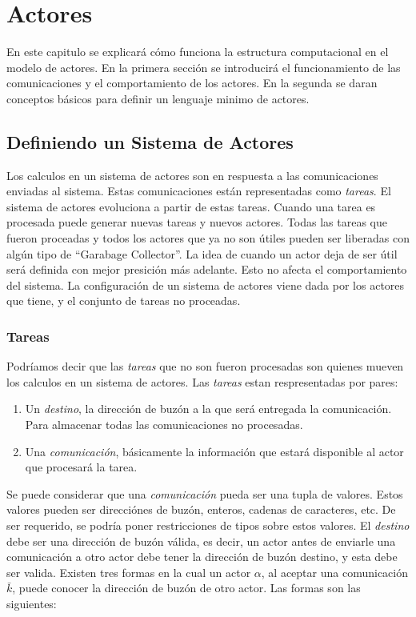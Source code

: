 \chapter{Actores}

En este capitulo se explicará cómo funciona la estructura computacional en el modelo de actores. En la primera sección se introducirá el funcionamiento de las comunicaciones y el comportamiento de los actores. En la segunda se daran conceptos básicos para definir un lenguaje minimo de actores.

\section{Definiendo un Sistema de Actores}

Los calculos en un sistema de actores son en respuesta a las comunicaciones enviadas al sistema. Estas comunicaciones están representadas como \textit{tareas}. El sistema de actores evoluciona a partir de estas tareas. Cuando una tarea es procesada puede generar nuevas tareas y nuevos actores. Todas las tareas que fueron proceadas y todos los actores que ya no son útiles pueden ser liberadas con algún tipo de ``Garabage Collector''. La idea de cuando un actor deja de ser útil será definida con mejor presición más adelante. Esto no afecta el comportamiento del sistema. La configuración de un sistema de actores viene dada por los actores que tiene, y el conjunto de tareas no proceadas.

\subsection{Tareas}

Podríamos decir que las \textit{tareas} que no son fueron procesadas son quienes mueven los calculos en un sistema de actores. Las \textit{tareas} estan respresentadas por pares:

\begin{enumerate}
\item Un \textit{destino}, la dirección de buzón a la que será entregada la comunicación. Para almacenar todas las comunicaciones no procesadas.
\item Una \textit{comunicación}, básicamente la información que estará disponible al actor que procesará la tarea.
\end{enumerate}

Se puede considerar que una \textit{comunicación} pueda ser una tupla de valores. Estos valores pueden ser direcciónes de buzón, enteros, cadenas de caracteres, etc. De ser requerido, se podría poner restricciones de tipos sobre estos valores. 
El \textit{destino} debe ser una dirección de buzón válida, es decir, un actor antes de enviarle una comunicación a otro actor debe tener la dirección de buzón destino, y esta debe ser valida. Existen tres formas en la cual un actor $\alpha$, al aceptar una comunicación $\bar{k}$, puede conocer la dirección de buzón de otro actor. Las formas son las siguientes:

